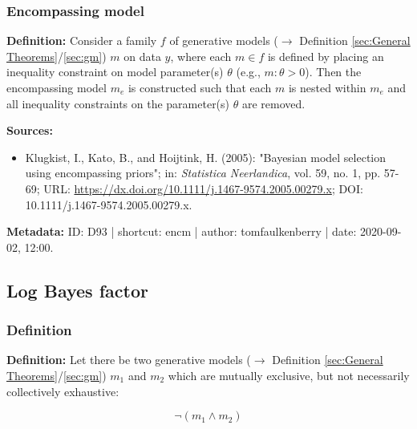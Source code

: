 \documentclass[a4paper,12pt,twoside]{book}
\begin{document}
\subsubsection[\textit{Encompassing model}]{Encompassing model} \label{sec:encm}
\setcounter{equation}{0}

\textbf{Definition:} Consider a family $f$ of generative models ($\rightarrow$ Definition \ref{sec:General Theorems}/\ref{sec:gm}) $m$ on data $y$, where each $m \in f$ is defined by placing an inequality constraint on model parameter(s) $\theta$ (e.g., $m:\theta>0$). Then the encompassing model $m_e$ is constructed such that each $m$ is nested within $m_e$ and all inequality constraints on the parameter(s) $\theta$ are removed.



\vspace{1em}
\textbf{Sources:}
\begin{itemize}
\item Klugkist, I., Kato, B., and Hoijtink, H. (2005): "Bayesian model selection using encompassing priors"; in: \textit{Statistica Neerlandica}, vol. 59, no. 1, pp. 57-69; URL: \url{https://dx.doi.org/10.1111/j.1467-9574.2005.00279.x}; DOI: 10.1111/j.1467-9574.2005.00279.x.
\end{itemize}


\vspace{1em}
\textbf{Metadata:} ID: D93 | shortcut: encm | author: tomfaulkenberry | date: 2020-09-02, 12:00.
\vspace{1em}



\subsection{Log Bayes factor}

\subsubsection[\textit{Definition}]{Definition} \label{sec:lbf}
\setcounter{equation}{0}

\textbf{Definition:} Let there be two generative models ($\rightarrow$ Definition \ref{sec:General Theorems}/\ref{sec:gm}) $m_1$ and $m_2$ which are mutually exclusive, but not necessarily collectively exhaustive:

\begin{equation} \label{eq:lbf-m12}
\neg (m_1 \land m_2)
\end{equation}
\end{document}
